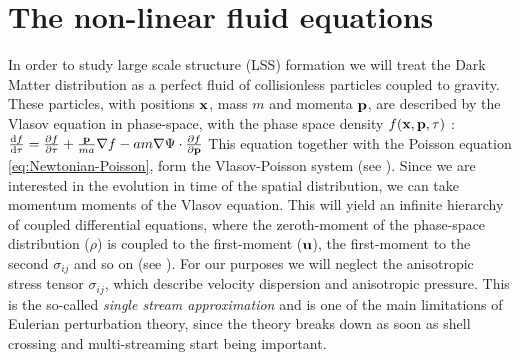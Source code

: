 \section{The non-linear fluid equations \label{sec:nonlinear-fluid}}

In order to study large scale structure (LSS) formation we will treat the Dark
Matter distribution as a perfect fluid of collisionless particles
coupled to gravity. These particles, with positions $\mathbf{x}$, mass
$m$ and momenta $\mathbf{p}$, are described by the Vlasov equation
in phase-space, with the phase space density $f(\mathbf{x}, \mathbf{p}, \tau)$
:
\beeqp$
\frac{\mathrm{d} {f} }{\mathrm{d} {\tau}} = \frac{\partial{f}}{\partial{\tau}} + \frac{\mathbf{p}}{m a} \nabla f -
a m \nabla \Psi \cdot \frac{\partial{f}}{\partial{\mathbf{p}}}
$
This equation together with the Poisson equation \cref{eq:Newtonian-Poisson},
form the Vlasov-Poisson system (see \cite{bernardeau_large-scale_2001}).
Since we are interested in the evolution in time of the spatial distribution,
we can take momentum moments of the Vlasov equation. This will yield
an infinite hierarchy of coupled differential equations, where the zeroth-moment
of the phase-space distribution ($\rho$) is coupled to the first-moment ($\mathbf{u}$),
the first-moment to the second $\sigma_{ij}$ and so on (see \cite{bernardeau_large-scale_2001}).
For our purposes we will neglect the anisotropic stress tensor $\sigma_{ij}$,
which describe velocity dispersion and anisotropic pressure.
This is the so-called \emph{single stream approximation} and is one of
the main limitations of Eulerian perturbation theory, since the theory
breaks down as soon as shell crossing and multi-streaming start being
important.

